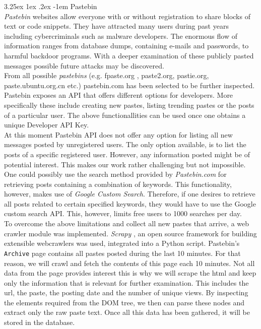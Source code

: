\documentclass[12pt]{article}
\makeatletter
\renewcommand\paragraph{\@startsection{paragraph}{5}{\z@}%
  {3.25ex \@plus1ex \@minus.2ex}%
  {-1em}%
  {\normalfont\normalsize\bfseries}}
\makeatother
\begin{document}
\newpage
\paragraph{Pastebin}
\hfill \break\\
\textit{Pastebin} websites \cite{fpaste} \cite{pastebin} allow everyone with or without registration to share blocks of text or code snippets. They have attracted many users during past years including cybercriminals such as malware developers\cite{pastebin-magazine}. The enormous flow of information ranges from database dumps, containing e-mails and passwords, to harmful backdoor programs. With a deeper examination of these publicly pasted messages possible future attacks may be discovered.
\hfill \break\\
From all possible \textit{pastebins} (e.g. fpaste.org \cite{fpaste}, paste2.org, pastie.org\cite{pastebin-pastie}, 
paste.ubuntu.org.cn \cite{pastebin-ubuntu} etc.) pastebin.com \cite{pastebin} has been selected to be further inspected.
\hfill \break
\\
Pastebin exposes an API that offers different options for developers. More specifically these include creating new pastes, listing trending pastes or the posts of a particular user. The above functionallities can be used once one obtains a unique Developer API Key. 
\hfill \break
\\
At this moment Pastebin API \cite{pastebin} does not offer any option for listing all new messages posted by unregistered users. The only option available, is to list the posts of a specific registered user. However, any information posted might be of potential interest. 
This makes our work rather challenging but not impossible.  
\hfill \break
\\
One could possibly use the search method provided by \textit{Pastebin.com} for retrieving posts containing a combination of keywords.
This functionality, however, makes use of \textit{Google Custom Search}. Therefore, if one desires to retrieve all posts related to certain specified keywords, they would have to use the Google custom search API. This, however, limits free users to 1000 searches per day. 
\hfill \break
\\
To overcome the above limitations and collect all new pastes that arrive, a web crawler module was implemented. \textit{Scrapy} \cite{scrapy}, an open source framework for building extensible webcrawlers was used, integrated into a Python script. Pastebin's \texttt{Archive} page contains all pastes posted during the last 10 minutes. For that reason, we will crawl and fetch the contents of this page each 10 minutes. Not all data from the page provides interest this is why we will scrape the html and keep only the information that is relevant for further examination. This includes the url, the paste, the posting date and the number of unique views. By inspecting the elements required from the DOM tree, we then can parse these nodes and extract only the raw paste text. Once all this data has been gathered, it will be stored in the database.
\end{document}
